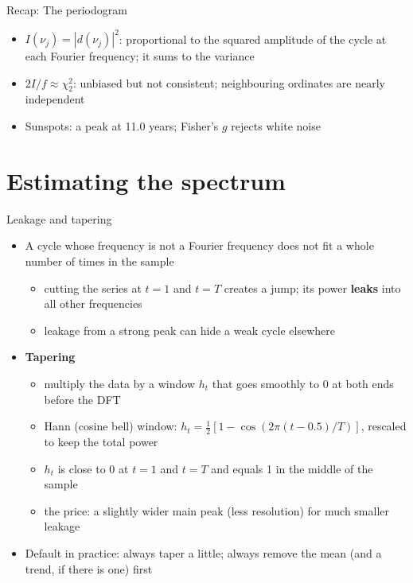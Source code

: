 \begin{frame}{Recap: The periodogram}
\itemsize{\small}
\begin{itemize}
    \item $I(\nu_j) = |d(\nu_j)|^2$: proportional to the squared amplitude of the cycle at each Fourier frequency; it sums to the variance
    \item $2I/f \approx \chi^2_2$: unbiased but not consistent; neighbouring ordinates are nearly independent
    \item Sunspots: a peak at 11.0 years; Fisher's $g$ rejects white noise
\end{itemize}
\end{frame}


\section{Estimating the spectrum}

\begin{frame}{Leakage and tapering}
\itemsize{\footnotesize}
\begin{itemize}
    \item A cycle whose frequency is not a Fourier frequency does not fit a whole number of times in the sample
    \begin{itemize}
        \item cutting the series at $t = 1$ and $t = T$ creates a jump; its power \textbf{leaks} into all other frequencies
        \item leakage from a strong peak can hide a weak cycle elsewhere
    \end{itemize}
    \item \textbf{Tapering}
    \begin{itemize}
        \item multiply the data by a window $h_t$ that goes smoothly to 0 at both ends before the DFT
        \item Hann (cosine bell) window: $h_t = \frac12[1 - \cos(2\pi(t - 0.5)/T)]$, rescaled to keep the total power
        \item $h_t$ is close to 0 at $t = 1$ and $t = T$ and equals 1 in the middle of the sample
        \item the price: a slightly wider main peak (less resolution) for much smaller leakage
    \end{itemize}
    \item Default in practice: always taper a little; always remove the mean (and a trend, if there is one) first
\end{itemize}
\end{frame}

